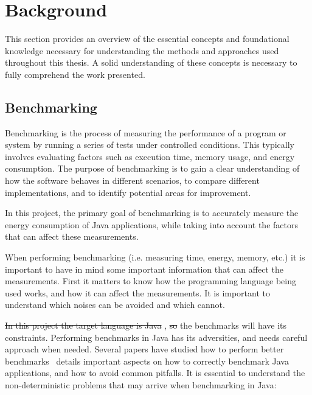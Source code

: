 
\chapter{Background}\label{chapter:background}

This section provides an overview of the essential concepts and foundational knowledge necessary for understanding the methods and approaches used throughout this thesis. A solid understanding of these concepts is necessary to fully comprehend the work presented.


\section{Benchmarking} \label{sec:background_benchmarking}

Benchmarking is the process of measuring the performance of a program or system by running a series of tests under controlled conditions. This typically involves evaluating factors such as execution time, memory usage, and energy consumption. The purpose of benchmarking is to gain a clear understanding of how the software behaves in different scenarios, to compare different implementations, and to identify potential areas for improvement.

In this project, the primary goal of benchmarking is to accurately measure the energy consumption of Java applications, while taking into account the factors that can affect these measurements. 

When performing benchmarking (i.e. measuring time, energy, memory, etc.) it is important to have in mind some important information that can affect the measurements. First it matters to know how the programming language being used works, and how it can affect the measurements. It is important to understand which noises can be avoided and which cannot.

\st{In this project the target language is Java} , \st{so} the benchmarks will have its constraints. Performing benchmarks in Java has its adversities, and needs careful approach when needed. Several papers have studied how to perform better benchmarks~\cite{10.1145/1297027.1297033,10.1145/1167515.1167488} details important aspects on how to correctly benchmark Java applications, and how to avoid common pitfalls.
It is essential to understand the non-deterministic problems that may arrive when benchmarking in Java:


